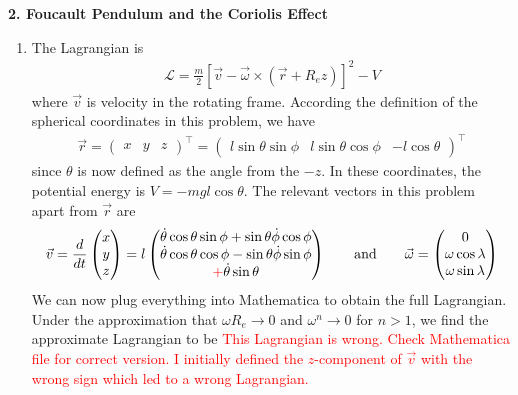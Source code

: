 \documentclass{article}
\theoremstyle{definition}
\newcommand{\lag}{\mathcal{L}}
\newcommand{\f}[2]{\frac{#1}{#2}}
\newcommand{\lb}{\left[}
\newcommand{\rb}{\right]}
\begin{document}
\newpage







\noindent \textbf{2. Foucault Pendulum and the Coriolis Effect}

\begin{enumerate}[label=(\alph*)]
	\item The Lagrangian is 
	\begin{align*}
	\lag = \f{m}{2}\lb \vec{v} - \vec{\omega} \times (\vec{r} + R_e \hat{z})  \rb^2 -V
	\end{align*}
	where $\vec{v}$ is velocity in the rotating frame. According the definition of the spherical coordinates in this problem, we have
	\begin{align*}
	\vec{r} = \begin{pmatrix}
	x & y & z
	\end{pmatrix}^\top
	= 
	\begin{pmatrix}
	l\sin\theta\sin\phi & 
	l\sin\theta\cos\phi &
	-l\cos\theta
	\end{pmatrix}^\top
	\end{align*}
	since $\theta$ is now defined as the angle from the $-\hat{z}$. In these coordinates, the potential energy is $V = -mgl\cos\theta$. The relevant vectors in this problem apart from $\vec{r}$ are
	\begin{align*}
	\vec{v} = \f{d}{dt}\begin{pmatrix}
	x\\y\\z
	\end{pmatrix} = 
	l\begin{pmatrix}
	\dot\theta \cos \theta \sin\phi+\sin\theta\dot\phi\cos\phi \\
	\dot\theta \cos\theta \cos\phi-\sin
	\theta \dot\phi \sin\phi\\
	\textcolor{red}{+}\dot\theta \sin \theta
	\end{pmatrix}
	\quad \quad \text{and} \quad\quad
	\vec{\omega} = \begin{pmatrix}
	0 \\ \omega \cos\lambda \\ \omega\sin\lambda
	\end{pmatrix}
	\end{align*}
	We can now plug everything into Mathematica to obtain the full Lagrangian. Under the approximation that $\omega R_e \to 0$ and $\omega^n \to 0$ for $n > 1$, we find the approximate Lagrangian to be \textcolor{red}{This Lagrangian is wrong. Check Mathematica file for correct version. I initially defined the $z$-component of $\vec{v}$ with the wrong sign which led to a wrong Lagrangian.}

\end{enumerate}
\end{document}

